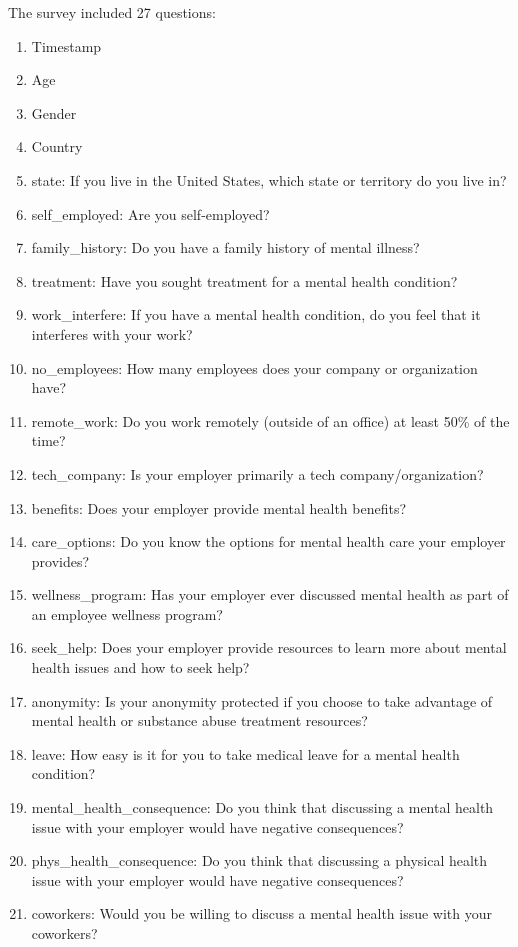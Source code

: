 \documentclass[conference]{IEEEtran}
\begin{document}
The survey included 27 questions:
\begin{enumerate}
    \item Timestamp
    \item Age
    \item Gender
    \item Country
    \item state: If you live in the United States, which state or territory do you live in?
    \item self\_employed: Are you self-employed?
    \item family\_history: Do you have a family history of mental illness?
    \item treatment: Have you sought treatment for a mental health condition? 
    \item work\_interfere: If you have a mental health condition, do you feel that it interferes with your work?
    \item no\_employees: How many employees does your company or organization have?
    \item remote\_work: Do you work remotely (outside of an office) at least 50\% of the time?
    \item tech\_company: Is your employer primarily a tech company/organization?
    \item benefits: Does your employer provide mental health benefits?
    \item care\_options: Do you know the options for mental health care your employer provides?
    \item wellness\_program: Has your employer ever discussed mental health as part of an employee wellness program?
    \item seek\_help: Does your employer provide resources to learn more about mental health issues and how to seek help?
    \item anonymity: Is your anonymity protected if you choose to take advantage of mental health or substance abuse treatment resources?
    \item leave: How easy is it for you to take medical leave for a mental health condition?
    \item mental\_health\_consequence: Do you think that discussing a mental health issue with your employer would have negative consequences?
    \item phys\_health\_consequence: Do you think that discussing a physical health issue with your employer would have negative consequences?
    \item coworkers: Would you be willing to discuss a mental health issue with your coworkers?

\end{enumerate}
\end{document}
